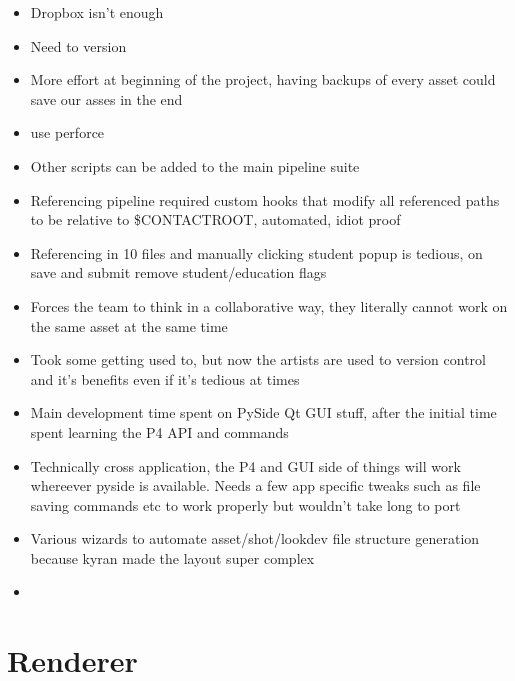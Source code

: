 \documentclass[11pt,a4paper,final,notitlepage]{report}
\begin{document}
\begin{itemize}
	\item Dropbox isn't enough
	\item Need to version
	\item More effort at beginning of the project, having backups of every asset could save our asses in the end
	\item use perforce
	\item Other scripts can be added to the main pipeline suite
	\item Referencing pipeline required custom hooks that modify all referenced paths to be relative to \$CONTACTROOT, automated, idiot proof
	\item Referencing in 10 files and manually clicking student popup is tedious, on save and submit remove student/education flags
	\item Forces the team to think in a collaborative way, they literally cannot work on the same asset at the same time
	\item Took some getting used to, but now the artists are used to version control and it's benefits even if it's tedious at times
	\item Main development time spent on PySide Qt GUI stuff, after the initial time spent learning the P4 API and commands
	\item Technically cross application, the P4 and GUI side of things will work whereever pyside is available. Needs a few app specific tweaks such as file saving commands etc to work properly but wouldn't take long to port
	\item Various wizards to automate asset/shot/lookdev file structure generation because kyran made the layout super complex
	\item 
\end{itemize}

\chapter{Renderer}
\end{document}
